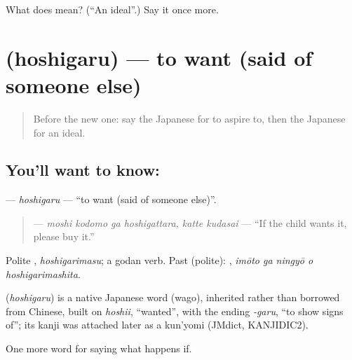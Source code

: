 \begin{tcolorbox}[breakable,colback=teal!4,colframe=teal!35!black,title={Before you move on}]
What does  mean? (\textquotedblleft{}An ideal\textquotedblright{}.) Say it once more.
\end{tcolorbox}
\section[\texorpdfstring{\ja{ほしがる} (hoshigaru)}{ほしがる (hoshigaru)}]{ (hoshigaru) — to want (said of someone else)}

\label{lesson:JA-C507-hoshigaru}



\begin{quote}
Before the new one: say the Japanese for to aspire to, then the Japanese for an ideal.
\end{quote}

\subsection*{You'll want to know: }
\textbf{} — \emph{hoshigaru} — \textquotedblleft{}to want (said of someone else)\textquotedblright{}.

\begin{quote}
\textbf{   } — \emph{moshi kodomo ga hoshigattara, katte kudasai} — \textquotedblleft{}If the child wants it, please buy it.\textquotedblright{}
\end{quote}

Polite \textbf{}, \emph{hoshigarimasu}; a godan verb. Past (polite): \textbf{  }, \emph{imōto ga ningyō o hoshigarimashita}.

\begin{cousinweb}
\textbf{} (\emph{hoshigaru}) is a native Japanese word (wago), inherited rather than borrowed from Chinese, built on \emph{hoshii}, \textquotedblleft{}wanted\textquotedblright{}, with the ending \emph{-garu}, \textquotedblleft{}to show signs of\textquotedblright{}; its kanji was attached later as a kun'yomi (JMdict, KANJIDIC2).
\end{cousinweb}

\begin{grammarlens}[title={What you've built}]
One more word for saying what happens if.
\end{grammarlens}

